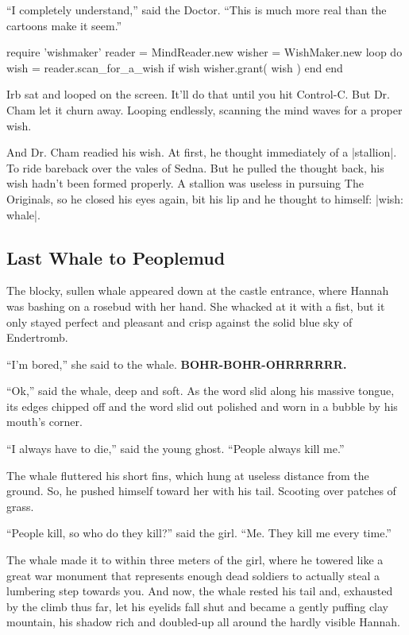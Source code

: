 \documentclass[12pt,twoside]{report}
\begin{document}
``I completely understand,'' said the Doctor.  ``This is much more
real than the cartoons make it seem.''


\begin{rubycode}

 require 'wishmaker'
 reader = MindReader.new
 wisher = WishMaker.new
 loop do
   wish = reader.scan_for_a_wish
   if wish
     wisher.grant( wish )
   end
 end

\end{rubycode}



Irb sat and looped on the screen.  It'll do that until you hit
Control-C.  But Dr. Cham let it churn away.  Looping endlessly,
scanning the mind waves for a proper wish.

And Dr. Cham readied his wish.  At first, he thought immediately of a
\rubyinline|stallion|.  To ride bareback over the
vales of Sedna.  But he pulled the thought back, his wish hadn't been
formed properly. A stallion was useless in pursuing The Originals, so
he closed his eyes again, bit his lip and he thought to himself:
\rubyinline|wish: whale|.



\subsection{Last Whale to Peoplemud}



The blocky, sullen whale appeared down at the castle entrance, where
Hannah was bashing on a rosebud with her hand.  She whacked at it with
a fist, but it only stayed perfect and pleasant and crisp against the
solid blue sky of Endertromb.

``I'm bored,'' she said to the whale.  {\bf BOHR-BOHR-OHRRRRRR.}

``Ok,'' said the whale, deep and soft.  As the word slid along his
massive tongue, its edges chipped off and the word slid out polished
and worn in a bubble by his mouth's corner.

``I always have to die,'' said the young ghost.  ``People always kill
me.''

The whale fluttered his short fins, which hung at useless distance
from the ground. So, he pushed himself toward her with his tail.
Scooting over patches of grass.

``People kill, so who do they kill?'' said the girl.  ``Me.  They kill
me every time.''

The whale made it to within three meters of the girl, where he towered
like a great war monument that represents enough dead soldiers to
actually steal a lumbering step towards you.  And now, the whale
rested his tail and, exhausted by the climb thus far, let his eyelids
fall shut and became a gently puffing clay mountain, his shadow rich
and doubled-up all around the hardly visible Hannah.
\end{document}
